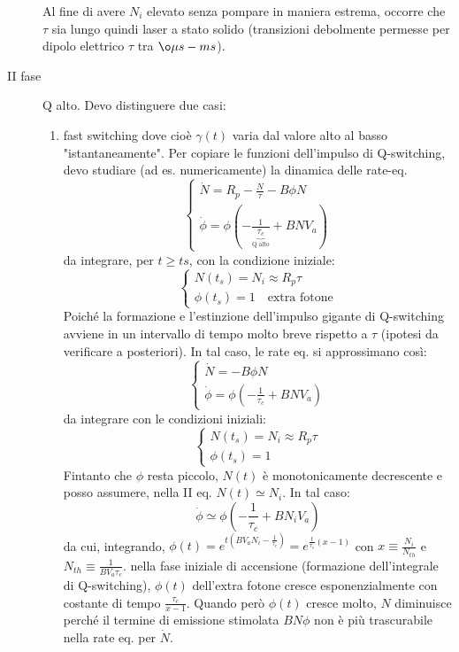 \begin{description}
Al fine di avere $N_i$ elevato senza pompare in maniera estrema, occorre che $\tau$ sia lungo quindi laser a stato solido (transizioni debolmente permesse per dipolo elettrico $\tau$ tra $\o \mu s - ms$).
\item [II fase] Q alto.
Devo distinguere due casi:
\begin{enumerate}
\item fast switching dove cioè $\gamma(t)$ varia dal valore alto al basso "istantaneamente". Per copiare le funzioni dell'impulso di Q-switching, devo studiare (ad es. numericamente) la dinamica delle rate-eq.
\begin{equation*}
\begin{cases}
\dot{N} = R_p - \frac{N}{\tau} - B\phi N\\
\dot{\phi} = \phi(-\frac{1}{\underbrace{\tau_c}_\text{Q alto}} + BN V_a)
\end{cases}
\end{equation*}
da integrare, per $t \geq ts$, con la condizione iniziale:
\begin{equation*}
\begin{cases}
N(t_s) = N_i \approx R_p\tau\\
\phi(t_s) = 1 \quad \text{extra fotone}
\end{cases}
\end{equation*}
Poiché la formazione e l'estinzione dell'impulso gigante di Q-switching avviene in un intervallo di tempo molto breve rispetto a $\tau$ (ipotesi da verificare a posteriori). In tal caso, le rate eq. si approssimano così:
\begin{equation*}
\begin{cases}
\dot{N} = - B\phi N\\
\dot{\phi} = \phi(-\frac{1}{\tau_c} + BN V_a)
\end{cases}
\end{equation*}
da integrare con le condizioni iniziali:
\begin{equation*}
\begin{cases}
N(t_s) = N_i \approx R_p\tau\\
\phi(t_s) = 1
\end{cases}
\end{equation*}
Fintanto che $\phi$ resta piccolo, $N(t)$ è monotonicamente decrescente e posso assumere, nella II eq. $N(t) \simeq N_i$. In tal caso:
\begin{equation*}
\dot{\phi} \simeq \phi(-\frac{1}{\tau_c} + BN_iV_a)
\end{equation*}
da cui, integrando, $\phi(t) = e^{t(BV_aN_i - \frac{1}{\tau_c})} = e^{\frac{t}{\tau_c}(x-1)}$ con $x \equiv \frac{N_i}{N_{th}}$ e $N_{th} \equiv \frac{1}{BV_a\tau_c}$. nella fase iniziale di accensione (formazione dell'integrale di Q-switching), $\phi(t)$ dell'extra fotone cresce esponenzialmente con costante di tempo $\frac{\tau_c}{x-1}$. Quando però $\phi(t)$ cresce molto, $N$ diminuisce perché il termine di emissione stimolata $BN\phi$ non è più trascurabile nella rate eq. per $\dot{N}$.

\end{enumerate}
\end{description}
